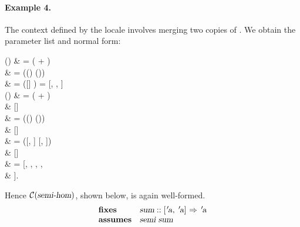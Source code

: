 \begin{isabellebody}
\begin{isamarkuptext}
\paragraph{Example 4.}
  The context defined by the locale  involves
  merging two copies of .  We obtain the parameter
  list and normal form:
\begin{align*%
}
  \pi() & = \pi( +
       )  \\
     & = (\pi() \App \pi())
        \\
     & = ([] ) 
     = [, , ] \\
  \N() & =
       \N( + ) \App \\
     & \phantom{==}
       [] \\
     & = (\N() \App \N()) \App \\
     & \phantom{==}
       [] \\
     & = ([, ] \App %
       [, ]) \App \\
     & \phantom{==}
       [] \\
     & = [, ,
       , , \\
     & \phantom{==}
       ].
\end{align*%
}
  Hence $\mathcal{C}(\emph{\sl semi{\mbox{-}}hom})$, shown below, is again well-formed.
\[
\begin{array}{ll}
  \textbf{fixes} & \isa{sum} :: \isa{{\isachardoublequote}{\isacharbrackleft}{\isacharprime}a{\isacharcomma}\ {\isacharprime}a{\isacharbrackright}\ {\isasymRightarrow}\ {\isacharprime}a{\isachardoublequote}} \\
  \textbf{assumes} & \isa{{\isachardoublequote}semi\ sum{\isachardoublequote}} \\

\end{array}\]
\end{isamarkuptext}
\end{isabellebody}
